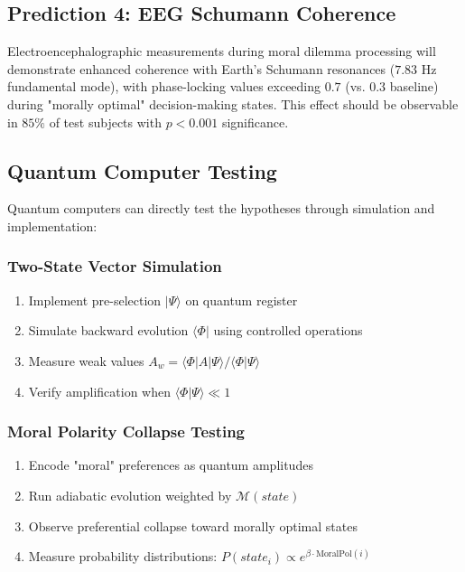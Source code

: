 \documentclass[12pt,a4paper]{article}
\theoremstyle{definition}
\begin{document}
\subsection{Prediction 4: EEG Schumann Coherence}
Electroencephalographic measurements during moral dilemma processing will demonstrate enhanced coherence with Earth's Schumann resonances ($7.83$ Hz fundamental mode), with phase-locking values exceeding $0.7$ (vs. $0.3$ baseline) during "morally optimal" decision-making states. This effect should be observable in $85\%$ of test subjects with $p < 0.001$ significance.

\subsection{Quantum Computer Testing}

Quantum computers can directly test the hypotheses through simulation and implementation:

\subsubsection{Two-State Vector Simulation}
\begin{enumerate}
    \item Implement pre-selection $|\Psi\rangle$ on quantum register
    \item Simulate backward evolution $\langle\Phi|$ using controlled operations
    \item Measure weak values $A_w = \langle\Phi|A|\Psi\rangle / \langle\Phi|\Psi\rangle$
    \item Verify amplification when $\langle\Phi|\Psi\rangle \ll 1$
\end{enumerate}

\subsubsection{Moral Polarity Collapse Testing}
\begin{enumerate}
    \item Encode "moral" preferences as quantum amplitudes
    \item Run adiabatic evolution weighted by $\mathcal{M}(state)$
    \item Observe preferential collapse toward morally optimal states
    \item Measure probability distributions: $P(state_i) \propto e^{\beta \cdot \text{MoralPol}(i)}$
\end{enumerate}
\end{document}
